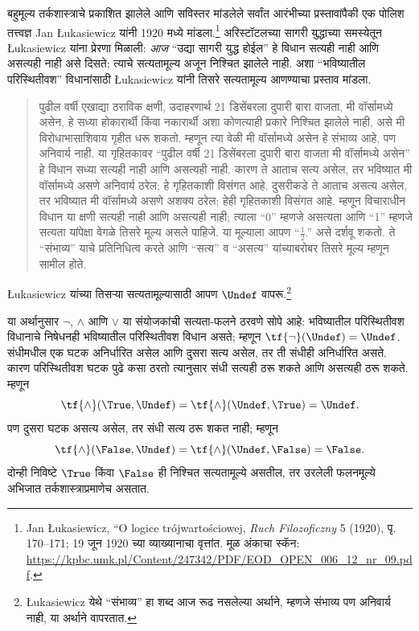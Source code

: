 \documentclass[../../../include/open-logic-section]{subfiles}
\begin{document}


बहुमूल्य तर्कशास्त्राचे प्रकाशित झालेले आणि सविस्तर मांडलेले
सर्वांत आरंभीच्या प्रस्तावांपैकी एक पोलिश तत्त्वज्ञ Jan \L ukasiewicz
यांनी 1920 मध्ये मांडला.\footnote{Jan \L ukasiewicz,
``O logice trójwartościowej, \emph{Ruch Filozoficzny} 5
(1920), पृ. 170--171; 19 जून 1920 च्या व्याख्यानाचा वृत्तांत.
मूळ अंकाचा स्कॅन: \url{https://kpbc.umk.pl/Content/247342/PDF/EOD_OPEN_006_12_nr_09.pdf}.} अरिस्टॉटलच्या सागरी युद्धाच्या समस्येतून
\L ukasiewicz यांना प्रेरणा मिळाली: \emph{आज} ``उद्या सागरी युद्ध
होईल'' हे विधान सत्यही नाही आणि असत्यही नाही असे दिसते; त्याचे
सत्यतामूल्य अजून निश्चित झालेले नाही. अशा ``भविष्यातील
परिस्थितीवश'' विधानांसाठी \L ukasiewicz यांनी तिसरे सत्यतामूल्य
आणण्याचा प्रस्ताव मांडला.
\begin{quote}
पुढील वर्षी एखाद्या ठराविक क्षणी, उदाहरणार्थ 21 डिसेंबरला दुपारी बारा वाजता,
मी वॉर्सामध्ये असेन, हे सध्या होकारार्थी किंवा नकारार्थी अशा
कोणत्याही प्रकारे निश्चित झालेले नाही, असे मी विरोधाभासाशिवाय
गृहीत धरू शकतो. म्हणून त्या वेळी मी वॉर्सामध्ये असेन हे संभाव्य
आहे, पण अनिवार्य नाही. या गृहितकावर ``पुढील वर्षी 21 डिसेंबरला
दुपारी बारा वाजता मी वॉर्सामध्ये असेन'' हे विधान सध्या सत्यही नाही आणि
असत्यही नाही. कारण ते आताच सत्य असेल, तर भविष्यात मी
वॉर्सामध्ये असणे अनिवार्य ठरेल; हे गृहितकाशी विसंगत आहे.
दुसरीकडे ते आताच असत्य असेल, तर भविष्यात मी वॉर्सामध्ये असणे
अशक्य ठरेल; हेही गृहितकाशी विसंगत आहे. म्हणून विचाराधीन
विधान या क्षणी सत्यही नाही आणि असत्यही नाही; त्याला ``0''
म्हणजे असत्यता आणि ``1'' म्हणजे सत्यता यांपेक्षा वेगळे तिसरे
मूल्य असले पाहिजे. या मूल्याला आपण ``$\frac{1}{2}$.'' असे
दर्शवू शकतो. ते ``संभाव्य'' याचे प्रतिनिधित्व करते आणि
``सत्य'' व ``असत्य'' यांच्याबरोबर तिसरे मूल्य म्हणून सामील होते.
\end{quote}
\L ukasiewicz यांच्या तिसऱ्या सत्यतामूल्यासाठी आपण $\Undef$
वापरू.\footnote{\L ukasiewicz येथे ``संभाव्य'' हा शब्द आज रूढ
नसलेल्या अर्थाने, म्हणजे संभाव्य पण अनिवार्य नाही, या अर्थाने
वापरतात.}

या अर्थानुसार $\lnot$, $\land$ आणि $\lor$ या संयोजकांची
सत्यता-फलने ठरवणे सोपे आहे: भविष्यातील परिस्थितीवश विधानाचे
निषेधनही भविष्यातील परिस्थितीवश विधान असते; म्हणून
$\tf{\lnot}(\Undef) = \Undef$. संधीमधील एक घटक अनिर्धारित
असेल आणि दुसरा सत्य असेल, तर ती संधीही अनिर्धारित असते.
कारण परिस्थितीवश घटक पुढे कसा ठरतो त्यानुसार संधी सत्यही
ठरू शकते आणि असत्यही ठरू शकते. म्हणून \[
    \tf{\land}(\True, \Undef) =
\tf{\land}(\Undef, \True) =
\Undef.
\]
पण दुसरा घटक असत्य असेल, तर संधी सत्य ठरू शकत नाही;
म्हणून \[\tf{\land}(\False, \Undef) =
\tf{\land}(\Undef, \False) = \False.\]
दोन्ही निविष्टे $\True$ किंवा $\False$ ही निश्चित सत्यतामूल्ये
असतील, तर उरलेली फलनमूल्ये अभिजात तर्कशास्त्राप्रमाणेच असतात.
\end{document}
